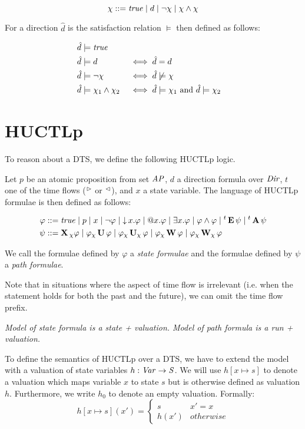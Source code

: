 \[
	\chi ::= \mathit{true} \mid d \mid \neg\chi \mid \chi\wedge\chi
\]

For a direction $\hat d$ is the satisfaction relation $\models$ then defined as follows:

\begin{alignat*}{4}
	\hat d &\models \mathit{true} \\
	\hat d &\models d 								&&\iff \hat d = d \\
	\hat d &\models \neg\chi 					 &&\iff \hat d\not\models\chi \\
	\hat d &\models \chi_1 \land \chi_2 	 &&\iff \hat d\models\chi_1 \text{ and } \hat d\models\chi_2
\end{alignat*}

\section{\Acl{HUCTLp}}

To reason about a \ac{DTS}, we define the following \ac{HUCTLp} logic.

Let $p$ be an atomic proposition from set $\mathit{AP}$, $d$ a direction formula over $\mathit{Dir}$,  $t$ one of the time flows (${}^\vartriangleright{}$ or ${}^\vartriangleleft{}$), and $x$ a state variable. The language of \ac{HUCTLp} formulae is then defined as follows:

\begin{align*}
	\varphi 	&::= 	\mathit{true} \mid p \mid x \mid  \neg \varphi \mid \operatorname{\downarrow} x. \varphi \mid \operatorname{@\!} x. \varphi \mid \exists x. \varphi  \mid \varphi \land \varphi \mid {}^{t}\operatorname{\mathbf{E}} \psi \mid {}^{t}\operatorname{\mathbf{A}} \psi \\
	\psi 		  &::= 	  \operatorname{\mathbf{X}}{}_{\chi} \varphi \mid
	\varphi {}_{\chi}\operatorname{\mathbf{U}} \varphi \mid
	\varphi {}_{\chi}\operatorname{\mathbf{U}}_{\chi} \varphi \mid
	\varphi {}_{\chi}\operatorname{\mathbf{W}} \varphi \mid
	\varphi {}_{\chi}\operatorname{\mathbf{W}}_{\chi} \varphi
\end{align*}

We call the formulae defined by $\varphi$ a \emph{state formulae} and the formulae defined by $\psi$ a \emph{path formulae}. 

Note that in situations where the aspect of time flow is irrelevant (i.e. when the statement holds for both the past and the future), we can omit the time flow prefix.

\emph{Model of state formula is a state + valuation. Model of path formula is a run + valuation.}

To define the semantics of \ac{HUCTLp} over a \ac{DTS}, we have to extend the model with a valuation of state variables $h : \mathit{Var} \to \mathit{S}$. We will use $h[x \mapsto s]$ to denote a valuation which maps variable $x$ to state $s$ but is otherwise defined as valuation $h$. Furthermore, we write $h_0$ to denote an empty valuation. Formally:
\[
	h[x \mapsto s](x') = \begin{cases}
		s & x' = x \\
		h(x') & otherwise
	\end{cases}
\]

